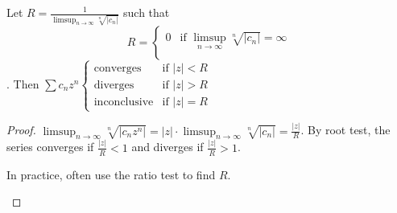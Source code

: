 \begin{theorem}
	\label{thm:3.39}
	Let $R=\frac{1}{\limsup_{n\to \infty}{\sqrt[n]{|c_{n}|}}}$ such that
	\[
		R= \begin{cases}
			0 & \text{if } \limsup_{n\to \infty}{\sqrt[n]{|c_{n}|}}=\infty \\
		\end{cases}
	\].
	Then $\sum{c_{n}z^{n}} \begin{cases}
			\text{converges}    & \text{if } |z|<R \\
			\text{diverges}     & \text{if } |z|>R \\
			\text{inconclusive} & \text{if } |z|=R
		\end{cases}$
	\begin{proof}
		$\limsup_{n\to \infty}{\sqrt[n]{|c_{n}z^{n}|}}=|z| \cdot \limsup_{n\to \infty}{\sqrt[n]{|c_{n}|}}=\frac{|z|}{R}$.
		By root test, the series converges if $\frac{|z|}{R}<1$ and diverges if $\frac{|z|}{R}>1$.
		\begin{note}
			In practice, often use the ratio test to find $R$.
		\end{note}
	\end{proof}
\end{theorem}

